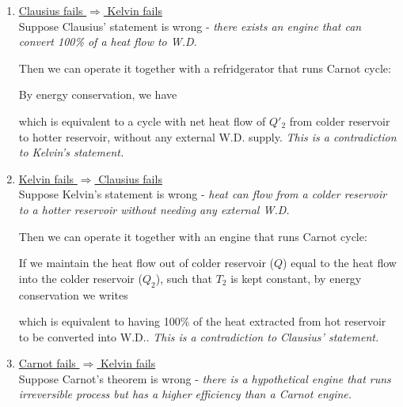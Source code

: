 \documentclass[class=article, crop=false, 12pt]{standalone}
\begin{document}
\begin{enumerate}
    \item \ul{Clausius fails $\Rightarrow$ Kelvin fails}\\
    Suppose Clausius' statement is wrong - 
    \it{there exists an engine that can convert 100\% of a heat flow to W.D.}


    Then we can operate it together with a refridgerator that runs Carnot cycle:


    By energy conservation, we have

    which is equivalent to a cycle with net heat flow of $Q'_2$ from colder reservoir to hotter reservoir,
    without any external W.D. supply. 
    \it{This is a contradiction to Kelvin's statement}.


    
    \item \ul{Kelvin fails $\Rightarrow$ Clausius fails}\\
    Suppose Kelvin's statement is wrong -
    \it{heat can flow from a colder reservoir to a hotter reservoir without needing any external W.D.}


    Then we can operate it together with an engine that runs Carnot cycle:


    If we maintain the heat flow out of colder reservoir ($Q$) equal to the heat flow into the colder reservoir ($Q_2$),
    such that $T_2$ is kept constant, by energy conservation we writes

    which is equivalent to having 100\% of the heat extracted from hot reservoir to be converted into W.D..
    \it{This is a contradiction to Clausius' statement}.


    \item \ul{Carnot fails $\Rightarrow$ Kelvin fails}\\
    Suppose Carnot's theorem is wrong - 
    \it{there is a hypothetical engine that runs irreversible process but has a higher efficiency than a Carnot engine}.


\end{enumerate}
\end{document}
